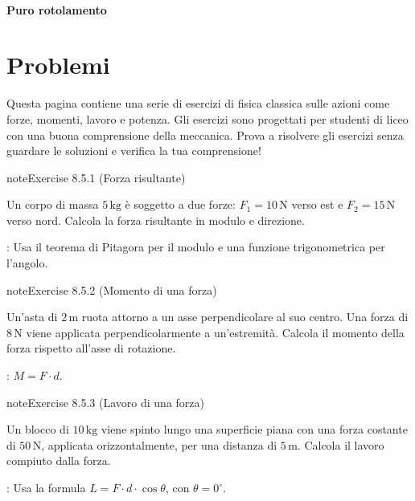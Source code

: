\documentclass[letterpaper,10pt,italian]{jupyterBook}
\begin{document}
\paragraph{Puro rotolamento}
\label{\detokenize{ch/mechanics/actions-examples:puro-rotolamento}}
\sphinxstepscope


\section{Problemi}
\label{\detokenize{ch/mechanics/actions-problems:problemi}}\label{\detokenize{ch/mechanics/actions-problems::doc}}
\sphinxAtStartPar
Questa pagina contiene una serie di esercizi di fisica classica sulle azioni come forze, momenti, lavoro e potenza. Gli esercizi sono progettati per studenti di liceo con una buona comprensione della meccanica. Prova a risolvere gli esercizi senza guardare le soluzioni e verifica la tua comprensione!
 \label{exercise:ch/mechanics/actions-problems-exercise-0}

\begin{sphinxadmonition}{note}{Exercise 8.5.1 (Forza risultante)}



\sphinxAtStartPar
Un corpo di massa \(5 \, \text{kg}\) è soggetto a due forze: \(F_1 = 10 \, \text{N}\) verso est e \(F_2 = 15 \, \text{N}\) verso nord. Calcola la forza risultante in modulo e direzione.

\sphinxAtStartPar
{}: Usa il teorema di Pitagora per il modulo e una funzione trigonometrica per l’angolo.
\end{sphinxadmonition}
 \label{exercise:ch/mechanics/actions-problems-exercise-1}

\begin{sphinxadmonition}{note}{Exercise 8.5.2 (Momento di una forza)}



\sphinxAtStartPar
Un’asta di \(2 \, \text{m}\) ruota attorno a un asse perpendicolare al suo centro. Una forza di \(8 \, \text{N}\) viene applicata perpendicolarmente a un’estremità. Calcola il momento della forza rispetto all’asse di rotazione.

\sphinxAtStartPar
{}: \( M = F \cdot d \).
\end{sphinxadmonition}
 \label{exercise:ch/mechanics/actions-problems-exercise-2}

\begin{sphinxadmonition}{note}{Exercise 8.5.3 (Lavoro di una forza)}



\sphinxAtStartPar
Un blocco di \(10 \, \text{kg}\) viene spinto lungo una superficie piana con una forza costante di \(50 \, \text{N}\), applicata orizzontalmente, per una distanza di \(5 \, \text{m}\). Calcola il lavoro compiuto dalla forza.

\sphinxAtStartPar
{}: Usa la formula \( L = F \cdot d \cdot \cos\theta \), con \(\theta = 0^\circ\).
\end{sphinxadmonition}
 \label{exercise:ch/mechanics/actions-problems-exercise-3}
\end{document}
